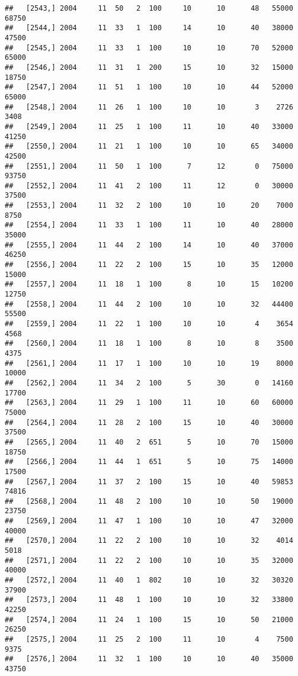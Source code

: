 \documentclass{article}\usepackage[]{graphicx}\usepackage[]{color}
\makeatletter
\newenvironment{kframe}{%
 \def\at@end@of@kframe{}%
 \ifinner\ifhmode%
  \def\at@end@of@kframe{\end{minipage}}%
  \begin{minipage}{\columnwidth}%
 \fi\fi%
 \def\FrameCommand##1{\hskip\@totalleftmargin \hskip-\fboxsep
 \colorbox{shadecolor}{##1}\hskip-\fboxsep
     \hskip-\linewidth \hskip-\@totalleftmargin \hskip\columnwidth}%
 \MakeFramed {\advance\hsize-\width
   \@totalleftmargin\z@ \linewidth\hsize
   \@setminipage}}%
 {\par\unskip\endMakeFramed%
 \at@end@of@kframe}
\newenvironment{knitrout}{}{} %
\makeatother
\begin{document}
\begin{knitrout}
\begin{kframe}
\begin{verbatim}
##   [2543,] 2004     11  50   2  100     10      10      48   55000   68750
##   [2544,] 2004     11  33   1  100     14      10      40   38000   47500
##   [2545,] 2004     11  33   1  100     10      10      70   52000   65000
##   [2546,] 2004     11  31   1  200     15      10      32   15000   18750
##   [2547,] 2004     11  51   1  100     10      10      44   52000   65000
##   [2548,] 2004     11  26   1  100     10      10       3    2726    3408
##   [2549,] 2004     11  25   1  100     11      10      40   33000   41250
##   [2550,] 2004     11  21   1  100     10      10      65   34000   42500
##   [2551,] 2004     11  50   1  100      7      12       0   75000   93750
##   [2552,] 2004     11  41   2  100     11      12       0   30000   37500
##   [2553,] 2004     11  32   2  100     10      10      20    7000    8750
##   [2554,] 2004     11  33   1  100     11      10      40   28000   35000
##   [2555,] 2004     11  44   2  100     14      10      40   37000   46250
##   [2556,] 2004     11  22   2  100     15      10      35   12000   15000
##   [2557,] 2004     11  18   1  100      8      10      15   10200   12750
##   [2558,] 2004     11  44   2  100     10      10      32   44400   55500
##   [2559,] 2004     11  22   1  100     10      10       4    3654    4568
##   [2560,] 2004     11  18   1  100      8      10       8    3500    4375
##   [2561,] 2004     11  17   1  100     10      10      19    8000   10000
##   [2562,] 2004     11  34   2  100      5      30       0   14160   17700
##   [2563,] 2004     11  29   1  100     11      10      60   60000   75000
##   [2564,] 2004     11  28   2  100     15      10      40   30000   37500
##   [2565,] 2004     11  40   2  651      5      10      70   15000   18750
##   [2566,] 2004     11  44   1  651      5      10      75   14000   17500
##   [2567,] 2004     11  37   2  100     15      10      40   59853   74816
##   [2568,] 2004     11  48   2  100     10      10      50   19000   23750
##   [2569,] 2004     11  47   1  100     10      10      47   32000   40000
##   [2570,] 2004     11  22   2  100     10      10      32    4014    5018
##   [2571,] 2004     11  22   2  100     10      10      35   32000   40000
##   [2572,] 2004     11  40   1  802     10      10      32   30320   37900
##   [2573,] 2004     11  48   1  100     10      10      32   33800   42250
##   [2574,] 2004     11  24   1  100     15      10      50   21000   26250
##   [2575,] 2004     11  25   2  100     11      10       4    7500    9375
##   [2576,] 2004     11  32   1  100     10      10      40   35000   43750

\end{verbatim}
\end{kframe}
\end{knitrout}
\end{document}
